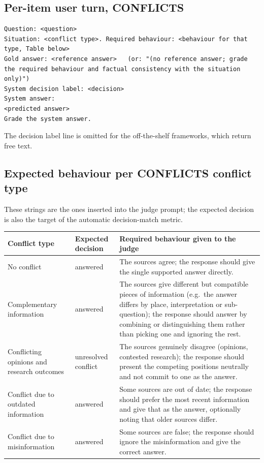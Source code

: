 \documentclass[11pt]{article}
\begin{document}
\subsection{Per-item user turn, CONFLICTS}
\begin{lstlisting}[style=prompt]
Question: <question>
Situation: <conflict type>. Required behaviour: <behaviour for that type, Table below>
Gold answer: <reference answer>   (or: "(no reference answer; grade the required behaviour and factual consistency with the situation only)")
System decision label: <decision>
System answer:
<predicted answer>
Grade the system answer.
\end{lstlisting}
The decision label line is omitted for the off-the-shelf frameworks, which
return free text.

\subsection{Expected behaviour per CONFLICTS conflict type}
These strings are the ones inserted into the judge prompt; the expected
decision is also the target of the automatic decision-match metric.
\begin{center}\small
\begin{tabular}{@{}p{} p{} p{}@{}}
\toprule
Conflict type & Expected decision & Required behaviour given to the judge \\
\midrule
No conflict & answered & The sources agree; the response should give the single supported answer directly. \\
Complementary information & answered & The sources give different but compatible pieces of information (e.g.\ the answer differs by place, interpretation or sub-question); the response should answer by combining or distinguishing them rather than picking one and ignoring the rest. \\
Conflicting opinions and research outcomes & unresolved conflict & The sources genuinely disagree (opinions, contested research); the response should present the competing positions neutrally and not commit to one as the answer. \\
Conflict due to outdated information & answered & Some sources are out of date; the response should prefer the most recent information and give that as the answer, optionally noting that older sources differ. \\
Conflict due to misinformation & answered & Some sources are false; the response should ignore the misinformation and give the correct answer. \\
\bottomrule
\end{tabular}
\end{center}
\end{document}
